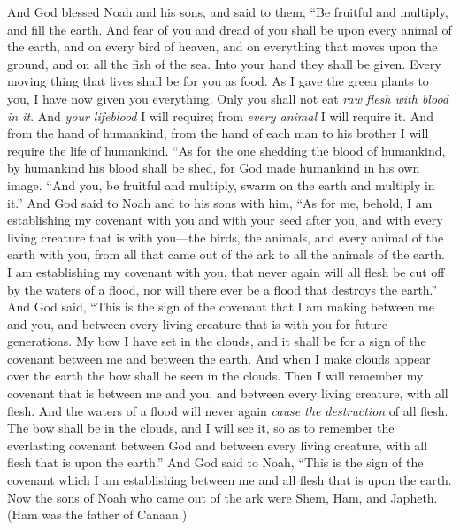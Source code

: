 \begin{biblechapter} %
 And God blessed Noah and his sons, and said to them, “Be fruitful and multiply, and fill the earth.
\verse And fear of you and dread of you shall be upon every animal of the earth, and on every bird of heaven, and on everything that moves upon the ground, and on all the fish of the sea. Into your hand they shall be given.
\verse Every moving thing that lives shall be for you as food. As I gave the green plants to you, I have now given you everything.
\verse Only you shall not eat \textit{raw flesh with blood in it}.
\verse And \textit{your lifeblood} I will require; from \textit{every animal} I will require it. And from the hand of humankind, from the hand of each man to his brother I will require the life of humankind.
\verse “As for the one shedding the blood of humankind, 
by humankind his blood shall be shed, 
for God made humankind in his own image.
\verse “And you, be fruitful and multiply, swarm on the earth and multiply in it.”
\verse And God said to Noah and to his sons with him,
\verse “As for me, behold, I am establishing my covenant with you and with your seed after you,
\verse and with every living creature that is with you—the birds, the animals, and every animal of the earth with you, from all that came out of the ark to all the animals of the earth.
\verse I am establishing my covenant with you, that never again will all flesh be cut off by the waters of a flood, nor will there ever be a flood that destroys the earth.”
\verse And God said, “This is the sign of the covenant that I am making between me and you, and between every living creature that is with you for future generations.
\verse My bow I have set in the clouds, and it shall be for a sign of the covenant between me and between the earth.
\verse And when I make clouds appear over the earth the bow shall be seen in the clouds.
\verse Then I will remember my covenant that is between me and you, and between every living creature, with all flesh. And the waters of a flood will never again \textit{cause the destruction} of all flesh.
\verse The bow shall be in the clouds, and I will see it, so as to remember the everlasting covenant between God and between every living creature, with all flesh that is upon the earth.”
\verse And God said to Noah, “This is the sign of the covenant which I am establishing between me and all flesh that is upon the earth.
 Now the sons of Noah who came out of the ark were Shem, Ham, and Japheth. (Ham was the father of Canaan.)

\end{biblechapter}
